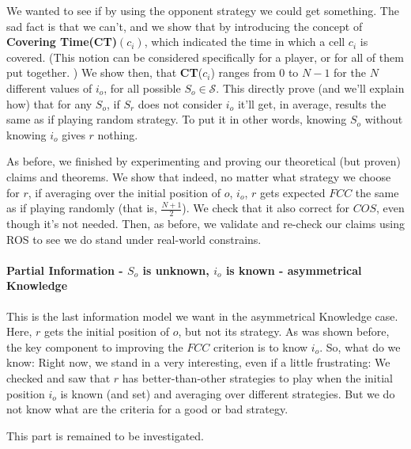 \documentclass[a4paper,english,10pt]{article}
\newcommand\rob{\ensuremath{r}\xspace}
\newcommand\opp{\ensuremath{o}\xspace}
\newcommand{\fcc}{\ensuremath{FCC}\xspace}
\newcommand{\coos}{\ensuremath{COS}\xspace}
\begin{document}
We wanted to see if by using the opponent strategy we could get something. The sad fact is that we can't, and we show that by introducing the concept of \textbf{Covering Time(CT)}$(c_i)$, which indicated the time in which a cell $c_i$ is covered. (This notion can be considered specifically for a player, or for all of them put together. ) We show then, that \textbf{CT}($c_i$) ranges from $0$ to $N-1$ for the $N$ different values of $i_\opp$, for all possible $S_\opp \in \mathcal{S}$. This directly prove (and we'll explain how) that for any $S_\opp$, if $S_\rob$ does not consider $i_\opp$ it'll get, in average, results the same as if playing random strategy.
To put it in other words, knowing $S_\opp$ without knowing $i_\opp$ gives \rob nothing.

As before, we finished by experimenting and proving our theoretical (but proven) claims and theorems. We show that indeed, no matter what strategy we choose for \rob, if averaging over the initial position of \opp, $i_\opp$, \rob gets expected \fcc the same as if playing randomly (that is, $\frac{N+1}{2}$).
We check that it also correct for \coos, even though it's not needed.
Then, as before, we validate and re-check our claims using ROS to see we do stand under real-world constrains.

\paragraph{Partial Information - $S_\opp$ is unknown, $i_\opp$ is known - asymmetrical Knowledge} 
This is the last information model we want in the asymmetrical Knowledge case. Here, \rob gets the initial position of \opp, but not its strategy.
As was shown before, the key component to improving the \fcc criterion is to know $i_\opp$. So, what do we know:
Right now, we stand in a very interesting, even if a little frustrating: We checked and saw that \rob has better-than-other strategies to play when the initial position $i_\opp$ is known (and set) and averaging over different strategies. But we do not know what are the criteria for a good or bad strategy.

This part is remained to be investigated. 
\end{document}
